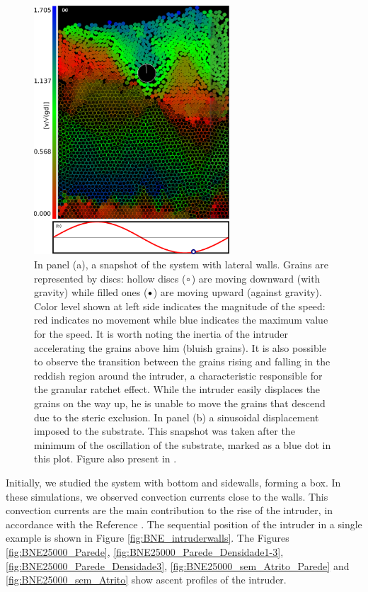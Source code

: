 \begin{figure}[H]
    \centering
    \includegraphics[width=0.65\textwidth]{04-figuras/BNE.pdf}
    \caption[BNE snapshot.]{In panel (a), a snapshot of the system with lateral walls. Grains are represented by discs: hollow discs ($\textcolor{black}{\circ}$) are moving downward (with gravity) while filled ones ($\textcolor{black}{\bullet}$) are moving upward (against gravity). Color level shown at left side indicates the magnitude of the speed: red indicates no movement while blue indicates the maximum value for the speed. It is worth noting the inertia of the intruder accelerating the grains above him (bluish grains). It is also possible to observe the transition between the grains rising and falling in the reddish region around the intruder, a characteristic responsible for the granular ratchet effect. While the intruder easily displaces the grains on the way up, he is unable to move the grains that descend due to the steric exclusion. In panel (b) a sinusoidal displacement imposed to the substrate. This snapshot was taken after the minimum of the oscillation of the substrate, marked as a blue dot in this plot. Figure also present in \cite{Large-deviation_quantification_of_boundary_conditions_on_the_Brazil_nut_effect}.}
    \label{fig:BNE}
\end{figure}

    Initially, we studied the system with bottom and sidewalls, forming a box. In these simulations, we observed convection currents close to the walls. This convection currents are the main contribution to the rise of the intruder, in accordance with the Reference \cite{Scaling_behavior_in_convection-driven_Brazil-nut_effect}. The sequential position of the intruder in a single example is shown in Figure \ref{fig:BNE_intruderwalls}. The Figures \ref{fig:BNE25000_Parede}, \ref{fig:BNE25000_Parede_Densidade1-3}, \ref{fig:BNE25000_Parede_Densidade3}, \ref{fig:BNE25000_sem_Atrito_Parede} and \ref{fig:BNE25000_sem_Atrito} show ascent profiles of the intruder.

